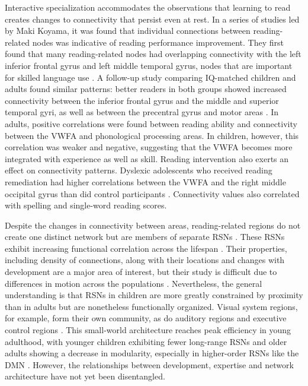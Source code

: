 Interactive specialization accommodates the observations that learning to read creates changes to connectivity that persist even at rest. In a series of studies led by Maki Koyama, it was found that individual connections between reading-related nodes was indicative of reading performance improvement. They first found that many reading-related nodes had overlapping connectivity with the left inferior frontal gyrus and left middle temporal gyrus, nodes that are important for skilled language use \citep{Koyama2010}. A follow-up study comparing IQ-matched children and adults found similar patterns: better readers in both groups showed increased connectivity between the inferior frontal gyrus and the middle and superior temporal gyri, as well as between the precentral gyrus and motor areas \citep{Koyama2011}. In adults, positive correlations were found between reading ability and connectivity between the VWFA and phonological processing areas.  In children, however, this correlation was weaker and negative, suggesting that the VWFA becomes more integrated with experience as well as skill. Reading intervention also exerts an effect on connectivity patterns. Dyslexic adolescents who received reading remediation had higher correlations between the VWFA and the right middle occipital gyrus than did control participants \citep{Koyama2013}. Connectivity values also correlated with spelling and single-word reading scores.

Despite the changes in connectivity between areas, reading-related regions do not create one distinct network but are members of separate RSNs \citep{Vogel2013}. These RSNs exhibit increasing functional correlation across the lifespan \citep{Kesler2013, Uddin2010}. Their properties, including density of connections, along with their locations and changes with development are a major area of interest, but their study is difficult due to differences in motion across the populations \citep{Power2013}. Nevertheless, the general understanding is that RSNs in children are more greatly constrained by proximity than in adults but are nonetheless functionally organized. Visual system regions, for example, form their own community, as do auditory regions and executive control regions \citep{Seeley2007}. This small-world architecture reaches peak efficiency in young adulthood, with younger children exhibiting fewer long-range RSNs and older adults showing a decrease in modularity, especially in higher-order RSNs like the DMN \citep{Cao2016}. However, the relationships between development, expertise and network architecture have not yet been disentangled. 

